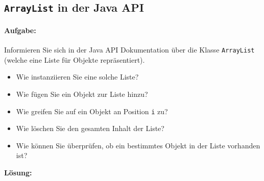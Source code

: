 \documentclass[a4paper,10pt, dvipsnames]{report}
\begin{document}
\subsection{\texttt{ArrayList} in der Java API}

\paragraph{Aufgabe:}
Informieren Sie sich in der Java API Dokumentation über die Klasse \texttt{ArrayList} (welche eine Liste für Objekte repräsentiert).

\begin{itemize}
    \item Wie instanziieren Sie eine solche Liste?
    \item Wie fügen Sie ein Objekt zur Liste hinzu?
    \item Wie greifen Sie auf ein Objekt an Position \texttt{i} zu?
    \item Wie löschen Sie den gesamten Inhalt der Liste?
    \item Wie können Sie überprüfen, ob ein bestimmtes Objekt in der Liste vorhanden ist?
\end{itemize}

\textbf{Lösung:}
\end{document}
